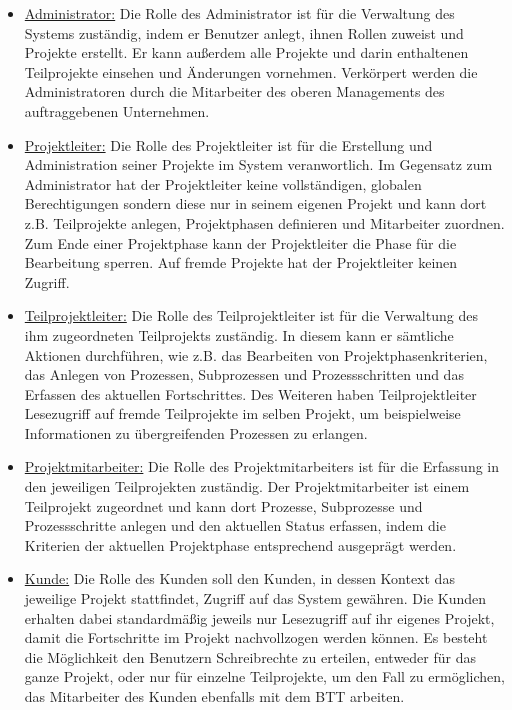 \begin{itemize}
    \item[] \underline{Administrator:} Die Rolle des Administrator ist für die Verwaltung des Systems zuständig, indem er Benutzer anlegt, ihnen Rollen zuweist und Projekte erstellt. Er kann außerdem alle Projekte und darin enthaltenen Teilprojekte einsehen und Änderungen vornehmen. Verkörpert werden die Administratoren durch die Mitarbeiter des oberen Managements des auftraggebenen Unternehmen.
    
    \item[] \underline{Projektleiter:} Die Rolle des Projektleiter ist für die Erstellung und Administration seiner Projekte im System veranwortlich. Im Gegensatz zum Administrator hat der Projektleiter keine vollständigen, globalen Berechtigungen sondern diese nur in seinem eigenen Projekt und kann dort z.B. Teilprojekte anlegen, Projektphasen definieren und Mitarbeiter zuordnen. Zum Ende einer Projektphase kann der Projektleiter die Phase für die Bearbeitung sperren. Auf fremde Projekte hat der Projektleiter keinen Zugriff. 
    
    \item[] \underline{Teilprojektleiter:} Die Rolle des Teilprojektleiter ist für die Verwaltung des ihm zugeordneten Teilprojekts zuständig. In diesem kann er sämtliche Aktionen durchführen, wie z.B. das Bearbeiten von Projektphasenkriterien, das Anlegen von Prozessen, Subprozessen und Prozessschritten und das Erfassen des aktuellen Fortschrittes. Des Weiteren haben Teilprojektleiter Lesezugriff auf fremde Teilprojekte im selben Projekt, um beispielweise Informationen zu übergreifenden Prozessen zu erlangen.

    \item[] \underline{Projektmitarbeiter:} Die Rolle des Projektmitarbeiters ist für die Erfassung in den jeweiligen Teilprojekten zuständig. Der Projektmitarbeiter ist einem Teilprojekt zugeordnet und kann dort Prozesse, Subprozesse und Prozessschritte anlegen und den aktuellen Status erfassen, indem die Kriterien der aktuellen Projektphase entsprechend ausgeprägt werden.

    \item[] \underline{Kunde:} Die Rolle des Kunden soll den Kunden, in dessen Kontext das jeweilige Projekt stattfindet, Zugriff auf das System gewähren. Die Kunden erhalten dabei standardmäßig jeweils nur Lesezugriff auf ihr eigenes Projekt, damit die Fortschritte im Projekt nachvollzogen werden können. Es besteht die Möglichkeit den Benutzern Schreibrechte zu erteilen, entweder für das ganze Projekt, oder nur für einzelne Teilprojekte, um den Fall zu ermöglichen, das Mitarbeiter des Kunden ebenfalls mit dem BTT arbeiten.  
\end{itemize}


